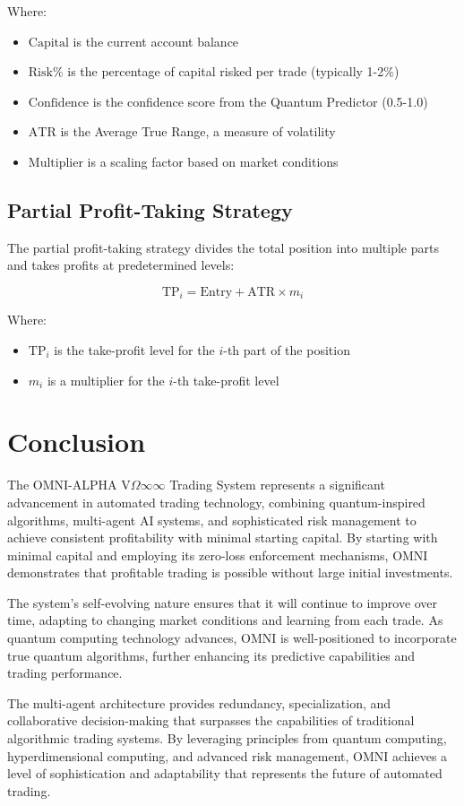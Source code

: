 \documentclass[11pt,a4paper]{article}
\begin{document}
Where:
\begin{itemize}
    \item $\text{Capital}$ is the current account balance
    \item $\text{Risk\%}$ is the percentage of capital risked per trade (typically 1-2\%)
    \item $\text{Confidence}$ is the confidence score from the Quantum Predictor (0.5-1.0)
    \item $\text{ATR}$ is the Average True Range, a measure of volatility
    \item $\text{Multiplier}$ is a scaling factor based on market conditions
\end{itemize}

\subsection{Partial Profit-Taking Strategy}

The partial profit-taking strategy divides the total position into multiple parts and takes profits at predetermined levels:

\begin{equation}
    \text{TP}_i = \text{Entry} + \text{ATR} \times m_i
\end{equation}

Where:
\begin{itemize}
    \item $\text{TP}_i$ is the take-profit level for the $i$-th part of the position
    \item $m_i$ is a multiplier for the $i$-th take-profit level
\end{itemize}

\section{Conclusion}

The OMNI-ALPHA V$\Omega\infty\infty$ Trading System represents a significant advancement in automated trading technology, combining quantum-inspired algorithms, multi-agent AI systems, and sophisticated risk management to achieve consistent profitability with minimal starting capital. By starting with minimal capital and employing its zero-loss enforcement mechanisms, OMNI demonstrates that profitable trading is possible without large initial investments.

The system's self-evolving nature ensures that it will continue to improve over time, adapting to changing market conditions and learning from each trade. As quantum computing technology advances, OMNI is well-positioned to incorporate true quantum algorithms, further enhancing its predictive capabilities and trading performance.

The multi-agent architecture provides redundancy, specialization, and collaborative decision-making that surpasses the capabilities of traditional algorithmic trading systems. By leveraging principles from quantum computing, hyperdimensional computing, and advanced risk management, OMNI achieves a level of sophistication and adaptability that represents the future of automated trading.
\end{document}
